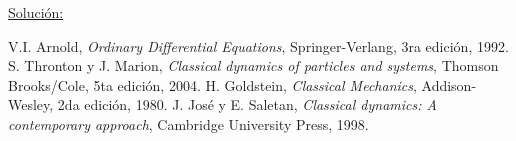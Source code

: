 \documentclass[a4paper,10pt]{article}
\numberwithin{equation}{section}
\begin{document}
\vspace{.3cm}

\underline{Solución:} \vspace{.3cm}

\begin{thebibliography}{10}
 V.I. Arnold, \emph{Ordinary Differential Equations}, Springer-Verlang,
 3ra edición, 1992.
 S. Thronton y J. Marion, \textit{Classical dynamics of particles and systems}, Thomson Brooks/Cole,
 5ta edición, 2004.
 H. Goldstein, \emph{Classical Mechanics}, Addison-Wesley, 2da edición,
 1980.
 J. José y E. Saletan, \emph{Classical dynamics: A contemporary approach}, Cambridge University Press,
 1998.
\end{thebibliography}
\end{document}

